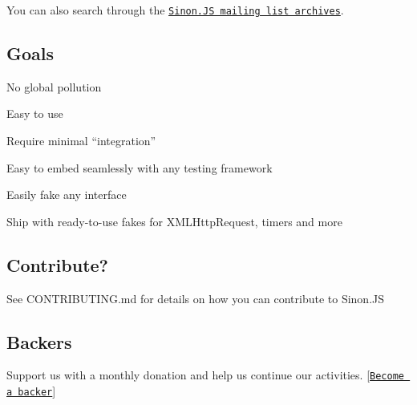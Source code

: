 You can also search through the \href{http://groups.google.com/group/sinonjs}{\tt Sinon.\+JS mailing list archives}.

\subsection*{Goals}


\begin{DoxyItemize}
\item No global pollution
\item Easy to use
\item Require minimal “integration”
\item Easy to embed seamlessly with any testing framework
\item Easily fake any interface
\item Ship with ready-\/to-\/use fakes for X\+M\+L\+Http\+Request, timers and more
\end{DoxyItemize}

\subsection*{Contribute?}

See C\+O\+N\+T\+R\+I\+B\+U\+T\+I\+NG.md for details on how you can contribute to Sinon.\+JS

\subsection*{Backers}

Support us with a monthly donation and help us continue our activities. \mbox{[}\href{https://opencollective.com/sinon#backer}{\tt Become a backer}\mbox{]}

